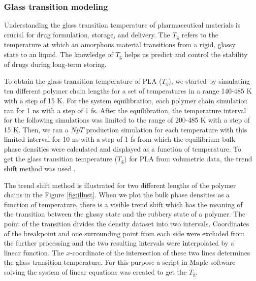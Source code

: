 \subsubsection{Glass transition modeling}
Understanding the glass transition temperature of pharmaceutical materials is crucial for drug formulation, storage, and delivery. The $T_\text{g}$ refers to the temperature at which an amorphous material transitions from a rigid, glassy state to an liquid. The knowledge of $T_\text{g}$ helps us predict and control the stability of drugs during long-term storing.  

To obtain the glass transition temperature of PLA ($T_\mathrm{g}$), we started by simulating ten different polymer chain lengths for a set of temperatures in a range 140-485 K with a step of 15 K. For the system equilibration, each polymer chain simulation ran for 1 ns with a step of 1 fs. After the equilibration, the temperature interval for the following simulations was limited to the range of 200-485 K with a step of 15 K. Then, we ran a $NpT$ production simulation for each temperature with this limited interval for 10 ns with a step of 1 fs from which the equilibrium bulk phase densities were calculated and displayed as a function of temperature. To get the glass transition temperature ($T_\mathrm{g}$) for PLA from volumetric data, the trend shift method was used \cite{klajmon_does_2022}. 

The trend shift method is illustrated for two different lengths of the polymer chains in the Figure \ref{fig:illust}. When we plot the bulk phase densities as a function of temperature, there is a visible trend shift which has the meaning of the transition between the glassy state and the rubbery state of a polymer. The point of the transition divides the density dataset into two intervals. Coordinates of the breakpoint and one surrounding point from each side were excluded from the further processing and the two resulting intervals were interpolated by a linear function. The $x$-coordinate of the intersection of these two lines determines the glass transition temperature. For this purpose a script in Maple software solving the system of linear equations was created to get the $T_\mathrm{g}$.

